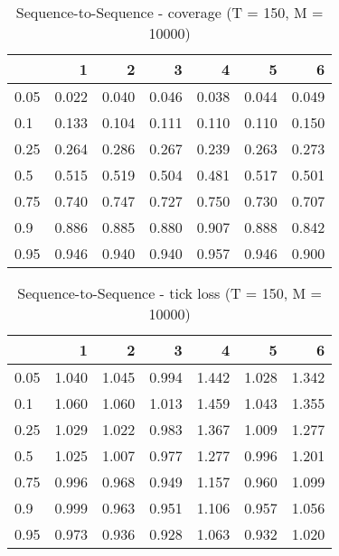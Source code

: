 \documentclass{article}
\begin{document}
\begin{table}[h!]
\centering
\caption{Sequence-to-Sequence - coverage (T = 150, M = 10000)}
\label{tab: Sequence-to-Sequence cov}
\begin{tabular}{lrrrrrr}
\toprule
 & 1 & 2 & 3 & 4 & 5 & 6 \\
\midrule
0.05 & 0.022 & 0.040 & 0.046 & 0.038 & 0.044 & 0.049 \\
0.1 & 0.133 & 0.104 & 0.111 & 0.110 & 0.110 & 0.150 \\
0.25 & 0.264 & 0.286 & 0.267 & 0.239 & 0.263 & 0.273 \\
0.5 & 0.515 & 0.519 & 0.504 & 0.481 & 0.517 & 0.501 \\
0.75 & 0.740 & 0.747 & 0.727 & 0.750 & 0.730 & 0.707 \\
0.9 & 0.886 & 0.885 & 0.880 & 0.907 & 0.888 & 0.842 \\
0.95 & 0.946 & 0.940 & 0.940 & 0.957 & 0.946 & 0.900 \\
\bottomrule
\end{tabular}
\end{table}

\begin{table}[h!]
\centering
\caption{Sequence-to-Sequence - tick loss (T = 150, M = 10000)}
\label{tab: Sequence-to-Sequence tic}
\begin{tabular}{lrrrrrr}
\toprule
 & 1 & 2 & 3 & 4 & 5 & 6 \\
\midrule
0.05 & 1.040 & 1.045 & 0.994 & 1.442 & 1.028 & 1.342 \\
0.1 & 1.060 & 1.060 & 1.013 & 1.459 & 1.043 & 1.355 \\
0.25 & 1.029 & 1.022 & 0.983 & 1.367 & 1.009 & 1.277 \\
0.5 & 1.025 & 1.007 & 0.977 & 1.277 & 0.996 & 1.201 \\
0.75 & 0.996 & 0.968 & 0.949 & 1.157 & 0.960 & 1.099 \\
0.9 & 0.999 & 0.963 & 0.951 & 1.106 & 0.957 & 1.056 \\
0.95 & 0.973 & 0.936 & 0.928 & 1.063 & 0.932 & 1.020 \\
\bottomrule
\end{tabular}
\end{table}
\end{document}

